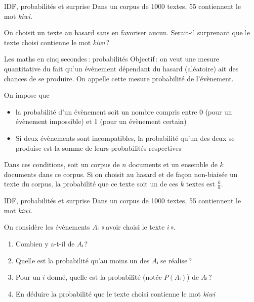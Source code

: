 \documentclass[../allslides.tex]{subfiles}
\begin{document}

\begin{frame}{IDF, probabilités et surprise}
	Dans un corpus de \num{1000} textes, \num{55} contiennent le mot \emph{kiwi}.
	\pause

	On choisit un texte au hasard sans en favoriser aucun. Serait-il surprenant que le texte choisi contienne le mot \emph{kiwi} ?
\end{frame}

\begin{frame}{Les maths en cinq secondes : probabilités}
	Objectif : on veut une mesure \alert{quantitative} du fait qu'un évènement dépendant du hasard (aléatoire) ait des chances de se produire. On appelle cette mesure \alert{probabilité} de l'évènement.
	
	\pause
	On impose que
	\begin{itemize}
		\item la probabilité d'un évènement soit un nombre compris entre \num{0} (pour un évènement impossible) et \num{1} (pour un évènement certain)
		\item Si deux évènements sont \alert{incompatibles}, la probabilité qu'un des deux se produise est la somme de leurs probabilités respectives
	\end{itemize}
	\itpause
	Dans ces conditions, soit un corpus de \(n\) documents et un ensemble de \(k\) documents dans ce corpus.
	Si on choisit au hasard et de façon non-biaisée un texte du corpus, la probabilité que ce texte soit un de ces \(k\) textes est \(\frac{k}{n}\).
\end{frame}

\begin{frame}{IDF, probabilités et surprise}
	Dans un corpus de \num{1000} textes, \num{55} contiennent le mot \emph{kiwi}.
	\pause
	
	On considère les évènements \(Aᵢ\) « avoir choisi le texte \(i\) ».
	\begin{enumerate}
		\item Combien y a-t-il de \(Aᵢ\) ?  \only<3->{→ \num{1000}}
		\item Quelle est la probabilité qu'au moins un des \(Aᵢ\) se réalise ?  \only<4->{→ \num{1}}
		\item Pour un \(i\) donné, quelle est la probabilité (notée \(P(Aᵢ)\)) de \(Aᵢ\) ?  \only<5->{→ \(\frac{1}{1000}\)}
		\item En déduire la probabilité que le texte choisi contienne le mot \emph{kiwi}  \only<6->{→ \(\frac{55}{1000}\)}
	\end{enumerate}
\end{frame}
\end{document}
